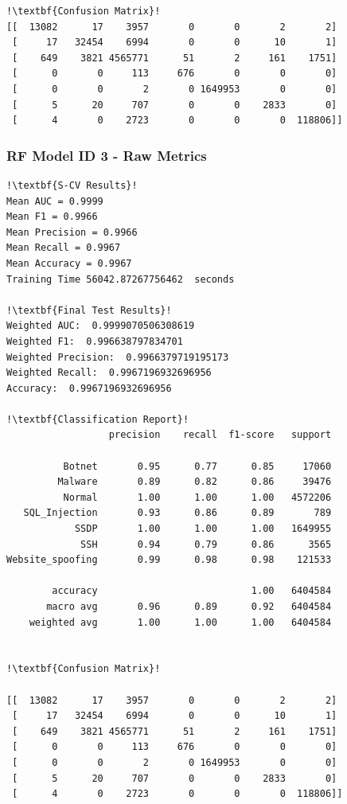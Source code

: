 \begin{appendices}
\begin{lstlisting}[escapechar=!]
!\textbf{Confusion Matrix}!    
[[  13082      17    3957       0       0       2       2]
 [     17   32454    6994       0       0      10       1]
 [    649    3821 4565771      51       2     161    1751]
 [      0       0     113     676       0       0       0]
 [      0       0       2       0 1649953       0       0]
 [      5      20     707       0       0    2833       0]
 [      4       0    2723       0       0       0  118806]]
\end{lstlisting}

\newpage
\subsubsection{RF Model ID 3 - Raw Metrics}
\begin{lstlisting}[escapechar=!]
!\textbf{S-CV Results}!
Mean AUC = 0.9999
Mean F1 = 0.9966
Mean Precision = 0.9966
Mean Recall = 0.9967
Mean Accuracy = 0.9967
Training Time 56042.87267756462  seconds

!\textbf{Final Test Results}!
Weighted AUC:  0.9999070506308619
Weighted F1:  0.996638797834701
Weighted Precision:  0.9966379719195173
Weighted Recall:  0.9967196932696956
Accuracy:  0.9967196932696956

!\textbf{Classification Report}!
				  precision    recall  f1-score   support

          Botnet       0.95      0.77      0.85     17060
         Malware       0.89      0.82      0.86     39476
          Normal       1.00      1.00      1.00   4572206
   SQL_Injection       0.93      0.86      0.89       789
            SSDP       1.00      1.00      1.00   1649955
             SSH       0.94      0.79      0.86      3565
Website_spoofing       0.99      0.98      0.98    121533

        accuracy                           1.00   6404584
       macro avg       0.96      0.89      0.92   6404584
    weighted avg       1.00      1.00      1.00   6404584
    
    
!\textbf{Confusion Matrix}!

[[  13082      17    3957       0       0       2       2]
 [     17   32454    6994       0       0      10       1]
 [    649    3821 4565771      51       2     161    1751]
 [      0       0     113     676       0       0       0]
 [      0       0       2       0 1649953       0       0]
 [      5      20     707       0       0    2833       0]
 [      4       0    2723       0       0       0  118806]]
\end{lstlisting}


\end{appendices}
